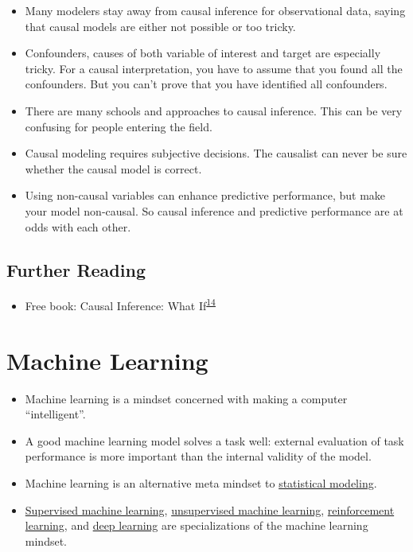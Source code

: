 \documentclass[
  10pt,
]{scrbook}
\providecommand{\tightlist}{%
  \setlength{\itemsep}{0pt}\setlength{\parskip}{0pt}}
\begin{document}
\begin{itemize}
\tightlist
\item
  Many modelers stay away from causal inference for observational data, saying that causal models are either not possible or too tricky.
\item
  Confounders, causes of both variable of interest and target are especially tricky. For a causal interpretation, you have to assume that you found all the confounders. But you can't prove that you have identified all confounders.
\item
  There are many schools and approaches to causal inference. This can be very confusing for people entering the field.
\item
  Causal modeling requires subjective decisions. The causalist can never be sure whether the causal model is correct.
\item
  Using non-causal variables can enhance predictive performance, but make your model non-causal. So causal inference and predictive performance are at odds with each other.
\end{itemize}

\hypertarget{further-reading}{%
\section{Further Reading}\label{further-reading}}

\begin{itemize}
\tightlist
\item
  Free book: Causal Inference: What If\textsuperscript{\protect\hyperlink{ref-hernan2010causal}{14}}
\end{itemize}

\hypertarget{machine-learning}{%
\chapter{Machine Learning}\label{machine-learning}}

\begin{itemize}
\tightlist
\item
  Machine learning is a mindset concerned with making a computer ``intelligent''.
\item
  A good machine learning model solves a task well: external evaluation of task performance is more important than the internal validity of the model.
\item
  Machine learning is an alternative meta mindset to \protect\hyperlink{statistical-ml}{statistical modeling}.
\item
  \protect\hyperlink{supervised-ml}{Supervised machine learning}, \protect\hyperlink{unsupervised-ml}{unsupervised machine learning}, \protect\hyperlink{reinforcement-learning}{reinforcement learning}, and \protect\hyperlink{deep-learning}{deep learning} are specializations of the machine learning mindset.
\end{itemize}
\end{document}
